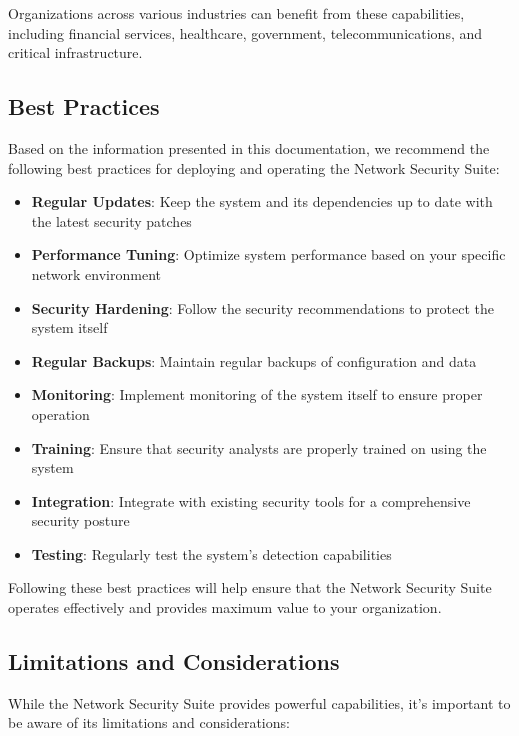 Organizations across various industries can benefit from these capabilities, including financial services, healthcare, government, telecommunications, and critical infrastructure.

\subsection{Best Practices}
Based on the information presented in this documentation, we recommend the following best practices for deploying and operating the Network Security Suite:

\begin{itemize}
    \item \textbf{Regular Updates}: Keep the system and its dependencies up to date with the latest security patches
    \item \textbf{Performance Tuning}: Optimize system performance based on your specific network environment
    \item \textbf{Security Hardening}: Follow the security recommendations to protect the system itself
    \item \textbf{Regular Backups}: Maintain regular backups of configuration and data
    \item \textbf{Monitoring}: Implement monitoring of the system itself to ensure proper operation
    \item \textbf{Training}: Ensure that security analysts are properly trained on using the system
    \item \textbf{Integration}: Integrate with existing security tools for a comprehensive security posture
    \item \textbf{Testing}: Regularly test the system's detection capabilities
\end{itemize}

Following these best practices will help ensure that the Network Security Suite operates effectively and provides maximum value to your organization.

\subsection{Limitations and Considerations}
While the Network Security Suite provides powerful capabilities, it's important to be aware of its limitations and considerations:

